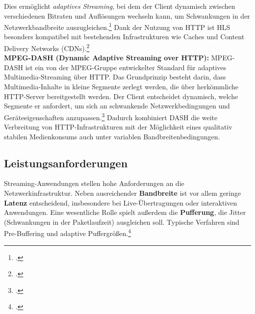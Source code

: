 \documentclass[12pt,a4paper]{report}
\begin{document}
  Dies ermöglicht \emph{adaptives Streaming}, bei dem der Client dynamisch zwischen verschiedenen Bitraten und Auflösungen wechseln kann,
  um Schwankungen in der Netzwerkbandbreite auszugleichen.\footcite[Vgl.][siehe HTTP Live Streaming Overview]{rfc8216}
  Dank der Nutzung von HTTP ist HLS besonders kompatibel mit bestehenden Infrastrukturen wie Caches und Content Delivery Networks (CDNs).\footcite[Vgl.][]{stockhammer2011dash}
  \\
  \newline
  \textbf{MPEG-DASH (Dynamic Adaptive Streaming over HTTP):}
  MPEG-DASH ist ein von der MPEG-Gruppe entwickelter Standard für adaptives Multimedia-Streaming über HTTP.
  Das Grundprinzip besteht darin, dass Multimedia-Inhalte in kleine Segmente zerlegt werden, die über herkömmliche HTTP-Server bereitgestellt werden.
  Der Client entscheidet dynamisch, welche Segmente er anfordert, um sich an schwankende Netzwerkbedingungen und Geräteeigenschaften anzupassen.\footcite[Vgl.][S.~1~ f.]{stockhammer2011dash}
  Dadurch kombiniert DASH die weite Verbreitung von HTTP-Infrastrukturen mit der Möglichkeit eines qualitativ stabilen Medienkonsums auch unter variablen Bandbreitenbedingungen.
    
  \subsection{Leistungsanforderungen}  
  Streaming-Anwendungen stellen hohe Anforderungen an die Netzwerkinfrastruktur. 
  Neben ausreichender \textbf{Bandbreite} ist vor allem geringe \textbf{Latenz} entscheidend, 
  insbesondere bei Live-Übertragungen oder interaktiven Anwendungen. 
  Eine wesentliche Rolle spielt außerdem die \textbf{Pufferung}, 
  die Jitter (Schwankungen in der Paketlaufzeit) ausgleichen soll. 
  Typische Verfahren sind Pre-Buffering und adaptive Puffergrößen.\footcite[Vgl.][S.~697~ff.]{tanenbaum_computernetworks}  
\end{document}
